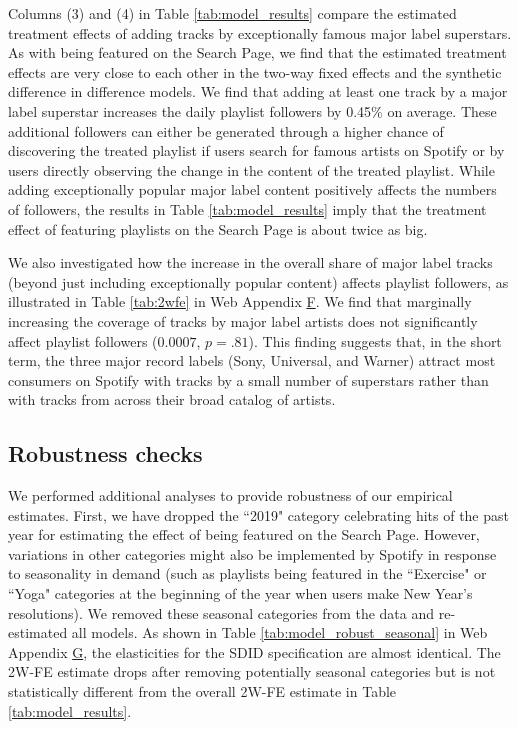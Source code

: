 Columns (3) and (4) in Table \ref{tab:model_results} compare the estimated treatment effects of adding tracks by exceptionally famous major label superstars. As with  being featured 
on the Search Page, we find that the estimated treatment effects are very close to each other in the two-way fixed effects and the synthetic difference in difference models. We find that adding at least one track by a major label superstar increases the daily playlist followers by 0.45\% on average. These additional followers can either be generated through a higher chance of discovering the treated playlist if users search for famous artists on Spotify or by users directly observing the change in the content of the treated playlist. While adding exceptionally popular major label content positively affects the numbers of followers, the results in Table \ref{tab:model_results} imply that the treatment effect of featuring playlists on the Search Page is about twice as big.

We also investigated how the increase in the overall share of major label tracks (beyond just including exceptionally popular content) affects playlist followers, as illustrated in Table \ref{tab:2wfe} in Web Appendix \hyperref[appendix:results]{F}. We find that marginally increasing the coverage of tracks by major label artists does not significantly affect playlist followers ($0.0007$, $p=.81$). This finding suggests that, in the short term, the three major record labels (Sony, Universal, and Warner) attract most consumers on Spotify with tracks by a small number of superstars rather than with tracks from across their broad catalog of artists. 

\subsection{Robustness checks}
We performed additional analyses to provide robustness of our empirical estimates.  
First, we have dropped the ``2019" category celebrating hits of the past year for estimating the effect of being featured on the Search Page. However, variations in other categories might also be implemented by Spotify in response to seasonality in demand (such as playlists being featured in the  ``Exercise" or ``Yoga" categories at the beginning of the year when users make New Year's resolutions). We removed these seasonal categories from the data and re-estimated all models. As shown in Table \ref{tab:model_robust_seasonal} in Web Appendix \hyperref[rob_checks]{G}, the elasticities for the SDID specification are almost identical. The 2W-FE estimate drops after removing potentially seasonal categories but is not statistically different from the overall 2W-FE estimate in Table \ref{tab:model_results}. 

